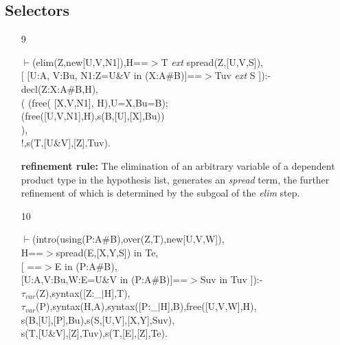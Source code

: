 \documentclass[11pt]{report}
\begin{document}
 \subsection{Selectors}
 \begin{enumerate} 
 \item[9]
\begin{sf}\begin{tabbing}
$\vdash$(elim(Z,new[U,V,N1]),H==$>$T \mbox{\it ext} spread(Z,[U,V,S]),\\[-0.15ex]
\hspace{2em}[ [U:A, V:Bu, N1:Z=U\&V in (X:A\#B)]==$>$Tuv \mbox{\it ext} S ]):-\\[-0.15ex]
\hspace{2em}decl(Z:X:A\#B,H),\\[-0.15ex]
\hspace{2em}( (free( [X,V,N1], H),U=X,Bu=B);\\[-0.15ex]
\hspace{3em}(free([U,V,N1],H),s(B,[U],[X],Bu))\\[-0.15ex]
\hspace{2em}),\\[-0.15ex]
\hspace{2em}!,s(T,[U\&V],[Z],Tuv).
\end{tabbing}\end{sf}

 {\bf refinement rule:}
 The elimination of an arbitrary variable of a dependent product
 type in the hypothesis list, generates an \emph{spread} term, the 
 further refinement of which is determined by the subgoal
 of the \emph{elim} step.
  
 \item[10]
\begin{sf}\begin{tabbing}
$\vdash$(intro(using(P:A\#B),over(Z,T),new[U,V,W]),\\[-0.15ex]
\hspace{2em}H==$>$spread(E,[X,Y,S]) in Te,\\[-0.15ex]
\hspace{2em}[ ==$>$E in (P:A\#B), \\[-0.15ex]
\hspace{3em}[U:A,V:Bu,W:E=U\&V in (P:A\#B)]==$>$Suv in Tuv ]):-\\[-0.15ex]
\hspace{2em}$\tau_{var}$(Z),syntax([Z:\_\hspace{0.1em}$\mid$H],T),\\[-0.15ex]
\hspace{2em}$\tau_{var}$(P),syntax(H,A),syntax([P:\_\hspace{0.1em}$\mid$H],B),free([U,V,W],H),\\[-0.15ex]
\hspace{2em}s(B,[U],[P],Bu),s(S,[U,V],[X,Y],Suv),\\[-0.15ex]
\hspace{2em}s(T,[U\&V],[Z],Tuv),s(T,[E],[Z],Te).
\end{tabbing}\end{sf}


\end{enumerate}
\end{document}
